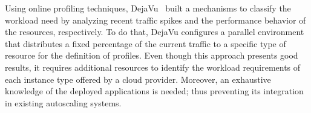 Using online profiling techniques, DejaVu~\cite{dejavu2012}  built a mechanisms to classify the workload need by analyzing recent traffic spikes and the performance behavior of the resources, respectively. To do that, DejaVu configures a parallel environment that distributes a fixed percentage of the current traffic to a specific type of resource for the definition of profiles. Even though this approach presents good results, it requires additional resources to identify the workload requirements of each instance type offered by a cloud provider. Moreover, an exhaustive knowledge of the deployed applications is needed; thus preventing its integration in existing autoscaling systems.  
















